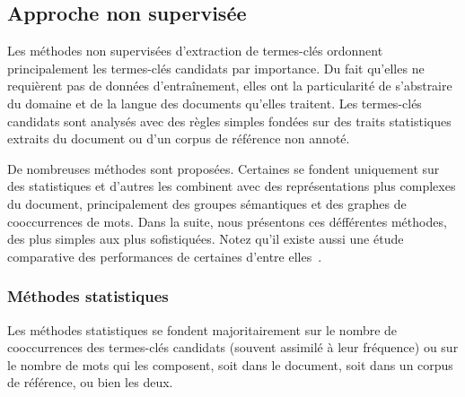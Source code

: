     \subsection{Approche non supervisée}
    \label{subsec:main-state_of_the_art-automatic_keyphrase_extraction-unsupervised_keyphrase_extraction}
      Les méthodes non supervisées d'extraction de termes-clés ordonnent
      principalement les termes-clés candidats par importance. Du fait qu'elles
      ne requièrent pas de données d'entraînement, elles ont la particularité de
      s'abstraire du domaine et de la langue des documents qu'elles traitent.
      Les termes-clés candidats sont analysés avec des règles simples fondées
      sur des traits statistiques extraits du document ou d'un corpus de
      référence non annoté.

      De nombreuses méthodes sont proposées. Certaines se fondent uniquement
      sur des statistiques et d'autres les combinent avec des représentations
      plus complexes du document, principalement des groupes sémantiques et des
      graphes de cooccurrences de mots. Dans la suite, nous présentons ces
      défférentes méthodes, des plus simples aux plus sofistiquées. Notez qu'il
      existe aussi une étude comparative des performances de certaines d'entre
      elles~\cite{hassan2010conundrums}.

      \subsubsection{Méthodes statistiques}
      \label{subsubsec:main-state_of_the_art-automatic_keyphrase_extraction-unsupervised_keyphrase_extraction-statistical_approaches}
        Les méthodes statistiques se fondent majoritairement sur le nombre de
        cooccurrences des termes-clés candidats (souvent assimilé à leur
        fréquence) ou sur le nombre de mots qui les composent, soit dans le
        document, soit dans un corpus de référence, ou bien les deux.

